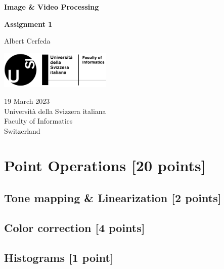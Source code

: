 \documentclass[tikz,14pt,fleqn]{article}
\newcommand\namesurname{Albert Cerfeda}
\newcommand\assignment{Assignment 1}
\newcommand\subject{Image \& Video Processing}
\newcommand\documentdate{19 March 2023}
\begin{document}
\begin{titlepage}
   \begin{center}
       \vspace*{0.2cm}

       \textbf{\Large{\subject}}

       \vspace{0.5cm}
        \textbf{\assignment}\\[5mm]
        
            
       \vspace{0.4cm}

        \namesurname
        \begin{figure}[H]
            \centering
        \end{figure}
       \tableofcontents

       \vspace*{\fill}
     
        \includegraphics[width=0.4\textwidth]{fig/logo.png}
       
        \documentdate \\
        Università della Svizzera italiana\\
        Faculty of Informatics\\
        Switzerland\\

   \end{center}
\end{titlepage}

\section{Point Operations [20 points]}


\subsection{Tone mapping \& Linearization [2 points]}


\subsection{Color correction [4 points]}


\subsection{Histograms [1 point]}
\end{document}
